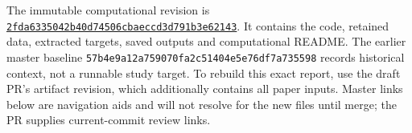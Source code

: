 The immutable computational revision is \href{https://github.com/alectionary/vibe-math/tree/2fda6335042b40d74506cbaeccd3d791b3e62143}{\texttt{2fda6335042b40d74506cbaeccd3d791b3e62143}}. It contains the code, retained data, extracted targets, saved outputs and computational README. The earlier master baseline \texttt{57b4e9a12a759070fa2c51404e5e76df7a735598} records historical context, not a runnable study target. To rebuild this exact report, use the draft PR's artifact revision, which additionally contains all paper inputs. Master links below are navigation aids and will not resolve for the new files until merge; the PR supplies current-commit review links.
